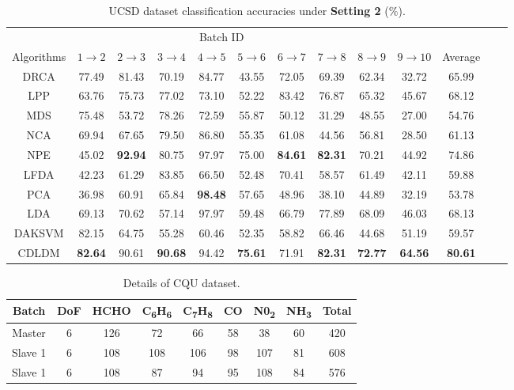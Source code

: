 \documentclass[a4paper]{cas-sc}
\begin{document}
\begin{table}[ht]
\centering
\setlength{\abovecaptionskip}{0pt}
\caption{UCSD dataset classification accuracies under \textbf{Setting 2} (\%).}
\setlength{\tabcolsep}{2.5 mm}
\begin{tabular}{@{}ccccccccccccc@{}}
\toprule
 \multicolumn{10}{c}{Batch ID}  \\
\cmidrule(lr){2-11}
Algorithms & $1 \rightarrow 2$ & $2 \rightarrow 3$ & $3 \rightarrow 4$ & $4 \rightarrow 5$ & $5 \rightarrow 6$ & $6 \rightarrow 7$ & $7 \rightarrow 8$ & $8 \rightarrow 9$ & $9 \rightarrow 10$ & Average \\
\midrule
DRCA & 77.49 & 81.43 & 70.19 & 84.77 & 43.55 & 72.05 & 69.39 & 62.34 & 32.72 & 65.99 \\
LPP & 63.76 & 75.73 & 77.02 & 73.10 & 52.22 & 83.42 & 76.87 & 65.32 & 45.67 & 68.12 \\
MDS & 75.48 & 53.72 & 78.26 & 72.59 & 55.87 & 50.12 & 31.29 & 48.55 & 27.00 & 54.76 \\
NCA & 69.94 & 67.65 & 79.50 & 86.80 & 55.35 & 61.08 & 44.56 & 56.81 & 28.50 & 61.13 \\
NPE & 45.02 & \bfseries{92.94} & 80.75 & 97.97 & 75.00 & \bfseries{84.61} & \bfseries{82.31} & 70.21 & 44.92 & 74.86 \\
LFDA & 42.23 & 61.29 & 83.85 & 66.50 & 52.48 & 70.41 & 58.57 & 61.49 & 42.11 & 59.88 \\
PCA & 36.98 & 60.91 & 65.84 & \bfseries{98.48} & 57.65 & 48.96 & 38.10 & 44.89 & 32.19 & 53.78 \\
LDA & 69.13 & 70.62 & 57.14 & 97.97 & 59.48 & 66.79 & 77.89 & 68.09 & 46.03 & 68.13 \\
DAKSVM & 82.15 & 64.75 & 55.28 & 60.46 & 52.35 & 58.82 & 66.46 & 44.68 & 51.19 & 59.57 \\
CDLDM & \bfseries{82.64} & 90.61 & \bfseries{90.68} & 94.42 & \bfseries{75.61} & 71.91 & \bfseries{82.31} & \bfseries{72.77} & \bfseries{64.56} & \bfseries{80.61} \\
\bottomrule
\end{tabular}
\label{4.2.2}
\end{table}

\begin{table}[ht]
\centering
\setlength{\abovecaptionskip}{0pt}
\caption{Details of CQU dataset.}
\setlength{\tabcolsep}{5mm} 
\begin{tabular}{ccccccccc}
\toprule
Batch & DoF & HCHO & C\textsubscript{6}H\textsubscript{6} & C\textsubscript{7}H\textsubscript{8} & CO & N0\textsubscript{2} & NH\textsubscript{3} & Total \\
\midrule
Master & 6 & 126 & 72 & 66 & 58 & 38 & 60 & 420 \\
Slave 1 & 6 & 108 & 108 & 106 & 98 & 107 & 81 & 608 \\
Slave 1 & 6 & 108 & 87 & 94 & 95 & 108 & 84 & 576 \\
\bottomrule     
\end{tabular}
\label{data b}
\end{table}
\end{document}
